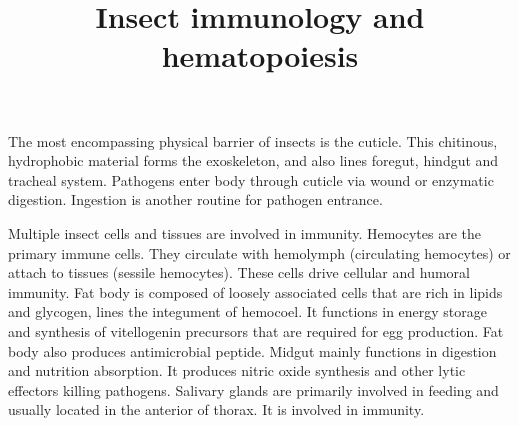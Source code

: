 \documentclass[11pt]{article}
\title{Insect immunology and hematopoiesis}
\author{}
\date{}
\begin{document}
\begin{sloppypar}
  \maketitle

  \linenumbers

The most encompassing physical barrier of insects is the cuticle. 
This chitinous, hydrophobic material forms the exoskeleton, and also lines foregut, hindgut and tracheal system. 
Pathogens enter body through cuticle via wound or enzymatic digestion. 
Ingestion is another routine for pathogen entrance. 

\par

Multiple insect cells and tissues are involved in immunity. 
Hemocytes are the primary immune cells. 
They circulate with hemolymph (circulating hemocytes) or attach to tissues (sessile hemocytes). 
These cells drive cellular and humoral immunity. 
Fat body is composed of loosely associated cells that are rich in lipids and glycogen, lines the integument of hemocoel. 
It functions in energy storage and synthesis of vitellogenin precursors that are required for egg production. 
Fat body also produces antimicrobial peptide. 
Midgut mainly functions in digestion and nutrition absorption. 
It produces nitric oxide synthesis and other lytic effectors killing pathogens. 
Salivary glands are primarily involved in feeding and usually located in the anterior of thorax. 
It is involved in immunity.

\par


\end{sloppypar}
\end{document}
